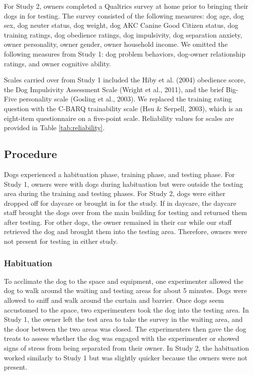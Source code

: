 \documentclass[
  pub,floatsintext]{apa6}
\begin{document}
For Study 2, owners completed a Qualtrics survey at home prior to bringing their dogs in for testing. The survey consisted of the following measures: dog age, dog sex, dog neuter status, dog weight, dog AKC Canine Good Citizen status, dog training ratings, dog obedience ratings, dog impulsivity, dog separation anxiety, owner personality, owner gender, owner household income. We omitted the following measures from Study 1: dog problem behaviors, dog-owner relationship ratings, and owner cognitive ability.

Scales carried over from Study 1 included the Hiby et al. (2004) obedience score, the Dog Impulsivity Assessment Scale (Wright et al., 2011), and the brief Big-Five personality scale (Gosling et al., 2003). We replaced the training rating question with the C-BARQ trainability scale (Hsu \& Serpell, 2003), which is an eight-item questionnaire on a five-point scale. Reliability values for scales are provided in Table \ref{tab:reliability}.

\hypertarget{procedure}{%
\subsection{Procedure}\label{procedure}}

Dogs experienced a habituation phase, training phase, and testing phase. For Study 1, owners were with dogs during habituation but were outside the testing area during the training and testing phases. For Study 2, dogs were either dropped off for daycare or brought in for the study. If in daycare, the daycare staff brought the dogs over from the main building for testing and returned them after testing. For other dogs, the owner remained in their car while our staff retrieved the dog and brought them into the testing area. Therefore, owners were not present for testing in either study.

\hypertarget{habituation}{%
\subsubsection{Habituation}\label{habituation}}

To acclimate the dog to the space and equipment, one experimenter allowed the dog to walk around the waiting and testing areas for about 5 minutes. Dogs were allowed to sniff and walk around the curtain and barrier. Once dogs seem accustomed to the space, two experimenters took the dog into the testing area. In Study 1, the owner left the test area to take the survey in the waiting area, and the door between the two areas was closed. The experimenters then gave the dog treats to assess whether the dog was engaged with the experimenter or showed signs of stress from being separated from their owner. In Study 2, the habituation worked similarly to Study 1 but was slightly quicker because the owners were not present.
\end{document}

